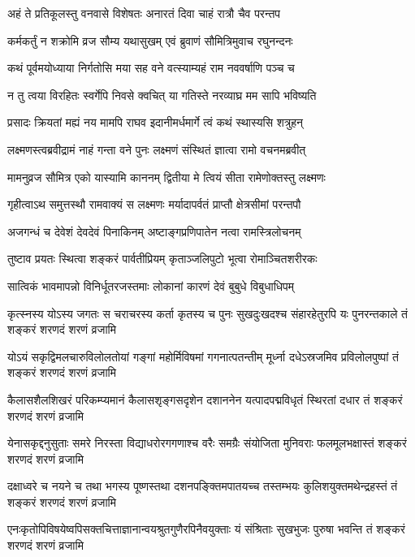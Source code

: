 \twolineshloka
{अहं ते प्रतिकूलस्तु वनवासे विशेषतः}
{अनारतं दिवा चाहं रात्रौ चैव परन्तप} %

\twolineshloka
{कर्मकर्तुं न शक्रोमि व्रज सौम्य यथासुखम्}
{एवं ब्रुवाणं सौमित्रिमुवाच रघुनन्दनः} %

\twolineshloka
{कथं पूर्वमयोध्याया निर्गतोसि मया सह}
{वने वत्स्याम्यहं राम नववर्षाणि पञ्च च} %

\twolineshloka
{न तु त्वया विरहितः स्वर्गेपि निवसे क्वचित्}
{या गतिस्ते नरव्याघ्र मम सापि भविष्यति} %

\twolineshloka
{प्रसादः क्रियतां मह्यं नय मामपि राघव}
{इदानीमर्धमार्गे त्वं कथं स्थास्यसि शत्रुहन्} %

\twolineshloka
{लक्ष्मणस्त्वब्रवीद्रामं नाहं गन्ता वने पुनः}
{लक्ष्मणं संस्थितं ज्ञात्वा रामो वचनमब्रवीत्} %

\twolineshloka
{मामनुव्रज सौमित्र एको यास्यामि काननम्}
{द्वितीया मे त्वियं सीता रामेणोक्तस्तु लक्ष्मणः} %

\twolineshloka
{गृहीत्वाऽथ समुत्तस्थौ रामवाक्यं स लक्ष्मणः}
{मर्यादापर्वतं प्राप्तौ क्षेत्रसीमां परन्तपौ} %

\twolineshloka
{अजगन्धं च देवेशं देवदेवं पिनाकिनम्}
{अष्टाङ्गप्रणिपातेन नत्वा रामस्त्रिलोचनम्} %

\twolineshloka
{तुष्टाव प्रयतः स्थित्वा शङ्करं पार्वतीप्रियम्}
{कृताञ्जलिपुटो भूत्वा रोमाञ्चितशरीरकः} %

\twolineshloka
{सात्विकं भावमापन्नो विनिर्धूतरजस्तमाः}
{लोकानां कारणं देवं बुबुधे विबुधाधिपम्} %

\twolineshloka
{कृत्स्नस्य योऽस्य जगतः स चराचरस्य कर्ता कृतस्य च पुनः सुखदुःखदश्च}
{संहारहेतुरपि यः पुनरन्तकाले तं शङ्करं शरणदं शरणं व्रजामि} %

\twolineshloka
{योऽयं सकृद्विमलचारुविलोलतोयां गङ्गां महोर्मिविषमां गगनात्पतन्तीम्}
{मूर्ध्ना दधेऽस्रजमिव प्रविलोलपुष्पां तं शङ्करं शरणदं शरणं व्रजामि} %

\twolineshloka
{कैलासशैलशिखरं परिकम्प्यमानं कैलासशृङ्गसदृशेन दशाननेन}
{यत्पादपद्मविधृतं स्थिरतां दधार तं शङ्करं शरणदं शरणं व्रजामि} %

\twolineshloka
{येनासकृद्दनुसुताः समरे निरस्ता विद्याधरोरगगणाश्च वरैः समग्रैः}
{संयोजिता मुनिवराः फलमूलभक्षास्तं शङ्करं शरणदं शरणं व्रजामि} %

\twolineshloka
{दक्षाध्वरे च नयने च तथा भगस्य पूष्णस्तथा दशनपङ्क्तिमपातयच्च}
{तस्तम्भयः कुलिशयुक्तमथेन्द्रहस्तं तं शङ्करं शरणदं शरणं व्रजामि} %

\twolineshloka
{एनःकृतोपिविषयेष्वपिसक्तचित्ताज्ञानान्वयश्रुतगुणैरपिनैवयुक्ताः}
{यं संश्रिताः सुखभुजः पुरुषा भवन्ति तं शङ्करं शरणदं शरणं व्रजामि} %

